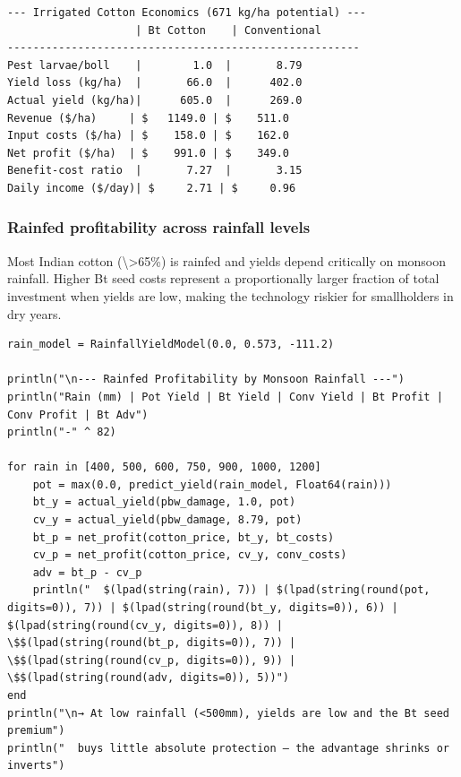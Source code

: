 \begin{verbatim}
--- Irrigated Cotton Economics (671 kg/ha potential) ---
                    | Bt Cotton    | Conventional
-------------------------------------------------------
Pest larvae/boll    |        1.0  |       8.79
Yield loss (kg/ha)  |       66.0  |      402.0
Actual yield (kg/ha)|      605.0  |      269.0
Revenue ($/ha)     | $   1149.0 | $    511.0
Input costs ($/ha) | $    158.0 | $    162.0
Net profit ($/ha)  | $    991.0 | $    349.0
Benefit-cost ratio  |       7.27  |       3.15
Daily income ($/day)| $     2.71 | $     0.96
\end{verbatim}



\subsubsection{Rainfed profitability across rainfall levels}



\label{8253663898455498064}{}


Most Indian cotton ({\textbackslash}>65\%) is rainfed and yields depend critically on monsoon rainfall. Higher Bt seed costs represent a proportionally larger fraction of total investment when yields are low, making the technology riskier for smallholders in dry years.




\begin{verbatim}
rain_model = RainfallYieldModel(0.0, 0.573, -111.2)

println("\n--- Rainfed Profitability by Monsoon Rainfall ---")
println("Rain (mm) | Pot Yield | Bt Yield | Conv Yield | Bt Profit | Conv Profit | Bt Adv")
println("-" ^ 82)

for rain in [400, 500, 600, 750, 900, 1000, 1200]
    pot = max(0.0, predict_yield(rain_model, Float64(rain)))
    bt_y = actual_yield(pbw_damage, 1.0, pot)
    cv_y = actual_yield(pbw_damage, 8.79, pot)
    bt_p = net_profit(cotton_price, bt_y, bt_costs)
    cv_p = net_profit(cotton_price, cv_y, conv_costs)
    adv = bt_p - cv_p
    println("  $(lpad(string(rain), 7)) | $(lpad(string(round(pot, digits=0)), 7)) | $(lpad(string(round(bt_y, digits=0)), 6)) | $(lpad(string(round(cv_y, digits=0)), 8)) | \$$(lpad(string(round(bt_p, digits=0)), 7)) | \$$(lpad(string(round(cv_p, digits=0)), 9)) | \$$(lpad(string(round(adv, digits=0)), 5))")
end
println("\n→ At low rainfall (<500mm), yields are low and the Bt seed premium")
println("  buys little absolute protection — the advantage shrinks or inverts")
\end{verbatim}




